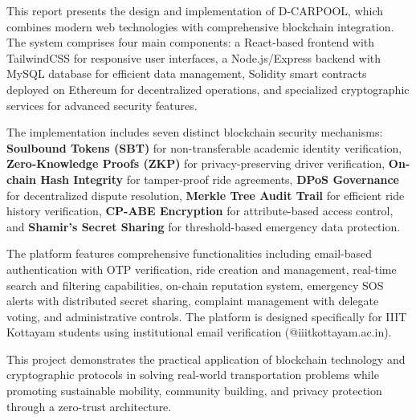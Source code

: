 \documentclass[12pt]{report}
\theoremstyle{plain}
\theoremstyle{definition}
\theoremstyle{remark}
\begin{document}
This report presents the design and implementation of D-CARPOOL, which combines modern web technologies with comprehensive blockchain integration. The system comprises four main components: a React-based frontend with TailwindCSS for responsive user interfaces, a Node.js/Express backend with MySQL database for efficient data management, Solidity smart contracts deployed on Ethereum for decentralized operations, and specialized cryptographic services for advanced security features.

The implementation includes seven distinct blockchain security mechanisms: \textbf{Soulbound Tokens (SBT)} for non-transferable academic identity verification, \textbf{Zero-Knowledge Proofs (ZKP)} for privacy-preserving driver verification, \textbf{On-chain Hash Integrity} for tamper-proof ride agreements, \textbf{DPoS Governance} for decentralized dispute resolution, \textbf{Merkle Tree Audit Trail} for efficient ride history verification, \textbf{CP-ABE Encryption} for attribute-based access control, and \textbf{Shamir's Secret Sharing} for threshold-based emergency data protection.

The platform features comprehensive functionalities including email-based authentication with OTP verification, ride creation and management, real-time search and filtering capabilities, on-chain reputation system, emergency SOS alerts with distributed secret sharing, complaint management with delegate voting, and administrative controls. The platform is designed specifically for IIIT Kottayam students using institutional email verification (@iiitkottayam.ac.in).

This project demonstrates the practical application of blockchain technology and cryptographic protocols in solving real-world transportation problems while promoting sustainable mobility, community building, and privacy protection through a zero-trust architecture.

\clearpage

\tableofcontents
\clearpage

\listoffigures
\listoftables

\newpage

 \setcounter{page}{1}











\end{document}
